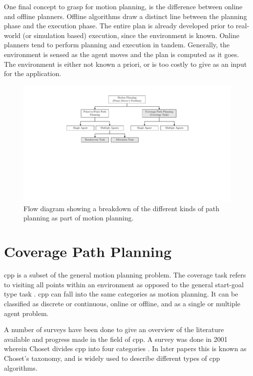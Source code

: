 One final concept to grasp for motion planning, is the difference between online and offline planners. Offline algorithms draw a distinct line between the planning phase and the execution phase. The entire plan is already developed prior to real-world (or simulation based) execution, since the environment is known. Online planners tend to perform planning and execution in tandem. Generally, the environment is sensed as the agent moves and the plan is computed as it goes. The environment is either not known a priori, or is too costly to give as an input for the application. \cite{AIbook}
\begin{figure}[h!]
	\centering
	\includegraphics[width=\textwidth,trim={7cm 8.5cm 6.5cm 1.5cm},clip]{figs/Motion.pdf} %
	\caption{Flow diagram showing a breakdown of the different kinds of path planning as part of motion planning.}
	\label{fig:MotionPlanning}
\end{figure}
\section{Coverage Path Planning}
\label{sec:LR-CPP}
\ac{cpp} is a subset of the general motion planning problem. The coverage task refers to visiting all points within an environment as opposed to the general start-goal type task \cite{Zhang2020}. \ac{cpp} can fall into the same categories as motion planning. It can be classified as discrete or continuous, online or offline, and as a single or multiple agent problem.

A number of surveys have been done to give an overview of the literature available and progress made in the field of \ac{cpp}. A survey was done in 2001 wherein Choset divides \ac{cpp} into four categories \cite{Choset2001}. In later papers this is known as Choset's taxonomy, and is widely used to describe different types of \ac{cpp} algorithms.

